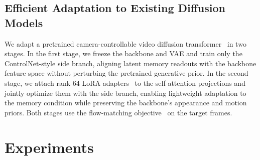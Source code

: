 \documentclass{llmxive}
\begin{document}
\subsection{Efficient Adaptation to Existing Diffusion Models}
We adapt a pretrained camera-controllable video diffusion
transformer~\cite{wan2025wan,zhao2026spatia} in two stages. 
In the first stage, we freeze the backbone and VAE and train only the
ControlNet-style side branch, aligning latent memory readouts with the
backbone feature space without perturbing the pretrained generative
prior. 
In the second stage, we attach rank-64 LoRA adapters~\cite{hu2021lora}
to the self-attention projections and jointly optimize them with the side
branch, enabling lightweight adaptation to the memory condition while
preserving the backbone's appearance and motion priors. 
Both stages use the flow-matching objective~\cite{lipman2022flow} on the
target frames.


\section{Experiments}
\label{sec:exp}
\end{document}
